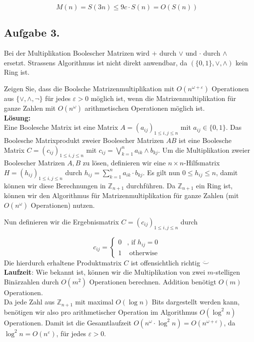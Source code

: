 \documentclass[11pt,a4paper,ngerman]{article}
\begin{document}
\begin{equation}
  M(n) = S(3n) {\leq} 9c\cdot S(n) = O(S(n))
\end{equation}


\subsection*{Aufgabe 3.}

Bei der Multiplikation Boolescher Matrizen wird $+$ durch $\lor$ und $\cdot$ durch $\land$ ersetzt. Strassens Algorithmus ist nicht direkt anwendbar, da $(\{0,1\}, \lor, \land)$ kein Ring ist.

Zeigen Sie, dass die Boolsche Matrizenmultiplikation mit $O( n^{\omega + \varepsilon} )$ Operationen aus $\{ \lor, \land, \neg \}$ für jedes $\varepsilon > 0$ möglich ist, wenn die Matrizenmultiplikation für ganze Zahlen mit $O(n^\omega )$ arithmetischen Operationen möglich ist.\\

\textbf{Lösung:}\\

Eine Boolesche Matrix ist eine Matrix $A = \left(a_{ij} \right)_{1 \leq i,j \leq n}$
mit $a_{ij} \in \{ 0,1 \}$. Das Boolesche Matrixprodukt zweier Boolescher Matrizen $AB$ ist eine
Boolesche Matrix $C = \left(c_{ij} \right)_{1 \leq i,j \leq n}$ mit 
$c_{ij} = \bigvee_{k = 1}^{n} a_{ik} \land b_{kj}$.
Um die Multiplikation zweier Boolescher Matrizen $A,B$ zu lösen,
definieren wir eine $n \times n$-Hilfsmatrix $H = \left(h_{ij} \right)_{1 \leq i,j \leq n}$ durch
$h_{ij} = \sum_{k=1}^{n} a_{ik}\cdot b_{kj}$. Es gilt nun $0 \leq h_{ij} \leq n$, damit können wir
diese Berechnungen in $\mathbb{Z}_{n+1}$  durchführen. Da $\mathbb{Z}_{n+1}$ ein Ring ist, können 
wir den Algorithmus für Matrizenmultiplikation für ganze Zahlen (mit $O(n^\omega)$ Operationen) nutzen.

Nun definieren wir die Ergebnismatrix $C = \left(c_{ij} \right)_{1 \leq i,j \leq n}$ durch

\begin{equation*}
c_{ij} = \begin{cases}
          0 & \text{, if $h_{ij} = 0$} \\
          1 & \text{ otherwise}
       \end{cases}
\end{equation*}
Die hierdurch erhaltene Produktmatrix  $C$ ist offensichtlich richtig $\ddot\smile$\\

\textbf{Laufzeit}: Wie bekannt ist, können wir die Multiplikation von zwei $m$-stelligen Binärzahlen
durch $O(m^2)$ Operationen berechnen. Addition benötigt $O(m)$ Operationen. \\
Da jede Zahl aus $\mathbb{Z}_{n+1}$ mit maximal $O(\log n)$ Bits dargestellt werden kann, benötigen
wir also pro arithmetischer Operation im Algorithmus $O(\log^2 n)$ Operationen.
Damit ist die Gesamtlaufzeit $O(n^{\omega} \cdot \log^2 n) = O(n^{\omega + \varepsilon})$, da
$\log^2 n = O(n^\varepsilon)$, für jedes $\varepsilon > 0$.
\label{LastPage}
\end{document}
